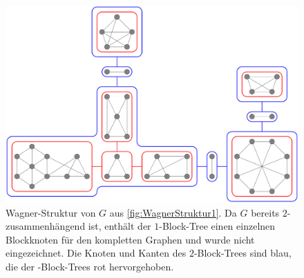 \begin{figure}[H]
  \centering
  \includegraphics[width=\textwidth,height=\textheight,keepaspectratio]{bilder/WagnerTheorem3.pdf}
  \caption{Wagner-Struktur von $G$ aus \Abb \ref{fig:WagnerStruktur1}.
           Da $G$ bereits $2$-zusammenhängend ist, enthält der $1$-Block-Tree einen einzelnen Blockknoten für den kompletten Graphen und wurde nicht eingezeichnet.
           Die Knoten und Kanten des $2$-Block-Trees sind blau, die der \dd-Block-Trees rot hervorgehoben.}
  \label{fig:WagnerStruktur3}
\end{figure}
